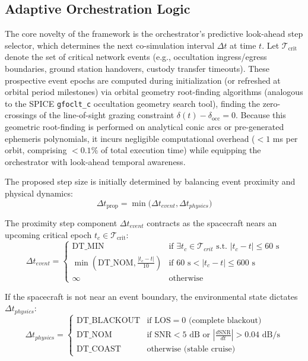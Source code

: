 \documentclass[a4paper,fleqn]{cas-sc}
\begin{document}
\subsection{Adaptive Orchestration Logic}
The core novelty of the framework is the orchestrator's predictive look-ahead step selector, which determines the next co-simulation interval $\Delta t$ at time $t$. Let $\mathcal{T}_{\text{crit}}$ denote the set of critical network events (e.g., occultation ingress/egress boundaries, ground station handovers, custody transfer timeouts). These prospective event epochs are computed during initialization (or refreshed at orbital period milestones) via orbital geometry root-finding algorithms (analogous to the SPICE \texttt{gfoclt\_c} occultation geometry search tool), finding the zero-crossings of the line-of-sight grazing constraint $\delta(t) - \delta_{\text{occ}} = 0$. Because this geometric root-finding is performed on analytical conic arcs or pre-generated ephemeris polynomials, it incurs negligible computational overhead ($<1$ ms per orbit, comprising $<0.1\%$ of total execution time) while equipping the orchestrator with look-ahead temporal awareness.

The proposed step size is initially determined by balancing event proximity and physical dynamics:
\begin{equation}
    \Delta t_{\text{prop}} = \min \Big( \Delta t_{event}, \Delta t_{physics} \Big)
    \label{eq:dt_selection}
\end{equation}

The proximity step component $\Delta t_{event}$ contracts as the spacecraft nears an upcoming critical epoch $t_c \in \mathcal{T}_{\text{crit}}$:
\begin{equation}
    \Delta t_{event} = \begin{cases}
      \text{DT\_MIN} & \text{if } \exists t_{c} \in \mathcal{T}_{crit} \text{ s.t. } |t_{c} - t| \le 60\text{ s} \\
      \min\left(\text{DT\_NOM}, \frac{|t_c - t|}{10}\right) & \text{if } 60\text{ s} < |t_{c} - t| \le 600\text{ s} \\
      \infty & \text{otherwise}
   \end{cases}
   \label{eq:dt_event}
\end{equation}

If the spacecraft is not near an event boundary, the environmental state dictates $\Delta t_{physics}$:
\begin{equation}
    \Delta t_{physics} = \begin{cases}
      \text{DT\_BLACKOUT} & \text{if } \text{LOS} = 0 \text{ (complete blackout)} \\
      \text{DT\_NOM} & \text{if } \text{SNR} < 5\text{ dB or } \left|\frac{d\text{SNR}}{dt}\right| > 0.04\text{ dB/s} \\
      \text{DT\_COAST} & \text{otherwise (stable cruise)}
   \end{cases}
   \label{eq:dt_physics}
\end{equation}
\end{document}
